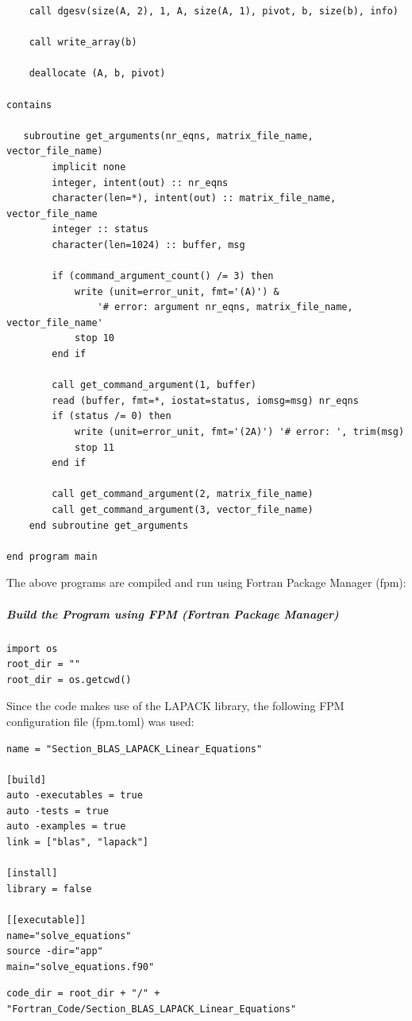 \begin{verbatim}
    call dgesv(size(A, 2), 1, A, size(A, 1), pivot, b, size(b), info)
    
    call write_array(b)

    deallocate (A, b, pivot)

contains

   subroutine get_arguments(nr_eqns, matrix_file_name, vector_file_name)
        implicit none
        integer, intent(out) :: nr_eqns
        character(len=*), intent(out) :: matrix_file_name, vector_file_name
        integer :: status
        character(len=1024) :: buffer, msg
        
        if (command_argument_count() /= 3) then
            write (unit=error_unit, fmt='(A)') &
                '# error: argument nr_eqns, matrix_file_name, vector_file_name'
            stop 10
        end if

        call get_command_argument(1, buffer)
        read (buffer, fmt=*, iostat=status, iomsg=msg) nr_eqns
        if (status /= 0) then
            write (unit=error_unit, fmt='(2A)') '# error: ', trim(msg)
            stop 11
        end if

        call get_command_argument(2, matrix_file_name)
        call get_command_argument(3, vector_file_name)
    end subroutine get_arguments

end program main
\end{verbatim}

The above programs are compiled and run using Fortran Package Manager (fpm):

\subparagraph{Build the Program using FPM (Fortran Package Manager)}

\begin{verbatim}
import os
root_dir = ""
root_dir = os.getcwd()
\end{verbatim}

Since the code makes use of the LAPACK library, the following FPM configuration file (fpm.toml) was used:

\begin{verbatim}
name = "Section_BLAS_LAPACK_Linear_Equations"

[build]
auto -executables = true
auto -tests = true
auto -examples = true
link = ["blas", "lapack"]

[install]
library = false

[[executable]]
name="solve_equations"
source -dir="app"
main="solve_equations.f90"
\end{verbatim}

\begin{verbatim}
code_dir = root_dir + "/" + "Fortran_Code/Section_BLAS_LAPACK_Linear_Equations"
\end{verbatim}

